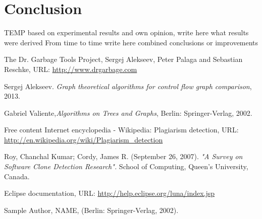 \documentclass{report}
\begin{document}

\chapter{Conclusion}
\label{cha:Conclusion}

TEMP
based on experimental results and own opinion, write here what results were derived 
From time to time write here combined conclusions or improvements




\newpage
%
\begin{thebibliography}{100} %

 The Dr. Garbage Tools Project\textregistered {}, Sergej Alekseev, Peter Palaga and Sebastian Reschke, URL:
\url{http://www.drgarbage.com}

  Sergej Alekseev. \emph{ Graph theoretical algorithms for control flow graph comparison}, 2013.
 
 Gabriel Valiente,\emph{Algorithms on Trees and Graphs}, Berlin: Springer-Verlag, 2002.


 Free content Internet encyclopedia - Wikipedia: Plagiarism detection, URL: \url{http://en.wikipedia.org/wiki/Plagiarism_detection}
 
 Roy, Chanchal Kumar; Cordy, James R. (September 26, 2007). \emph{"A Survey on Software Clone Detection Research".} School of Computing, Queen's University, Canada.

 Eclipse documentation, URL: \url{http://help.eclipse.org/luna/index.jsp}

 Sample Author, NAME,
(Berlin: Springer-Verlag, 2002).

\end{thebibliography} 
\end{document}
